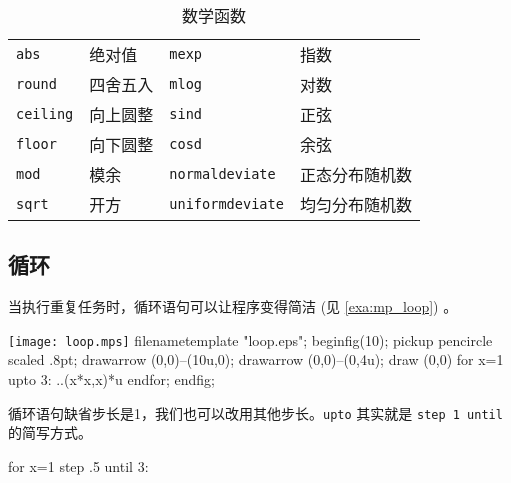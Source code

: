 \begin{table}[htbp]
\centering
\caption{\MP 数学函数}
\label{tab:mp_math_func}
\begin{tabular}{llll}
  \toprule
  \texttt{abs}     & 绝对值   & \texttt{mexp} & 指数 \\
  \texttt{round}   & 四舍五入 & \texttt{mlog} & 对数 \\
  \texttt{ceiling} & 向上圆整 & \texttt{sind} & 正弦 \\
  \texttt{floor}   & 向下圆整 & \texttt{cosd} & 余弦 \\
  \texttt{mod}     & 模余     & \texttt{normaldeviate} & 正态分布随机数 \\
  \texttt{sqrt}    & 开方     & \texttt{uniformdeviate} & 均匀分布随机数 \\
  \bottomrule
\end{tabular}
\end{table}

\subsection{循环}

当执行重复任务时，循环语句可以让程序变得简洁 (见 \autoref{exa:mp_loop}) 。

\begin{example}[h]
\begin{FBTDemo}[numbers=left]{\texttt{[image: loop.mps]}}
filenametemplate "loop.eps";
beginfig(10);
pickup pencircle scaled .8pt;
drawarrow (0,0)--(10u,0);
drawarrow (0,0)--(0,4u);
draw (0,0) %
for x=1 upto 3: ..(x*x,x)*u endfor;
endfig;
\end{FBTDemo}
\caption{\MP 循环}
\label{exa:mp_loop}
\end{example}

循环语句缺省步长是1，我们也可以改用其他步长。\texttt{upto} 其实就是 \texttt{step 1 until} 的简写方式。

\begin{Code}[]
for x=1 step .5 until 3: 
\end{Code}



